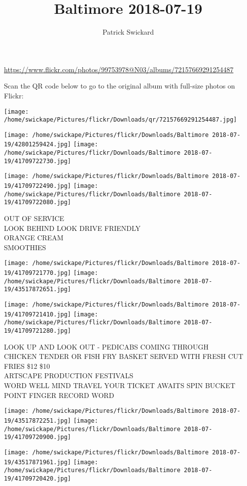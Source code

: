 \documentclass[10pt,letterpaper]{article}
\title{Baltimore 2018-07-19}
\author{Patrick Swickard}
\date{}
\begin{document}
\maketitle

\url{https://www.flickr.com/photos/99753978@N03/albums/72157669291254487}

Scan the QR code below to go to the original album with full-size photos on Flickr:

\texttt{[image: /home/swickape/Pictures/flickr/Downloads/qr/72157669291254487.jpg]}
\pagebreak

\texttt{[image: /home/swickape/Pictures/flickr/Downloads/Baltimore 2018-07-19/42801259424.jpg]}
\texttt{[image: /home/swickape/Pictures/flickr/Downloads/Baltimore 2018-07-19/41709722730.jpg]}

\texttt{[image: /home/swickape/Pictures/flickr/Downloads/Baltimore 2018-07-19/41709722490.jpg]}
\texttt{[image: /home/swickape/Pictures/flickr/Downloads/Baltimore 2018-07-19/41709722080.jpg]}

OUT OF SERVICE\\
LOOK BEHIND LOOK DRIVE FRIENDLY\\
ORANGE CREAM\\
SMOOTHIES
\pagebreak

\texttt{[image: /home/swickape/Pictures/flickr/Downloads/Baltimore 2018-07-19/41709721770.jpg]}
\texttt{[image: /home/swickape/Pictures/flickr/Downloads/Baltimore 2018-07-19/43517872651.jpg]}

\texttt{[image: /home/swickape/Pictures/flickr/Downloads/Baltimore 2018-07-19/41709721410.jpg]}
\texttt{[image: /home/swickape/Pictures/flickr/Downloads/Baltimore 2018-07-19/41709721280.jpg]}

LOOK UP AND LOOK OUT {-} PEDICABS COMING THROUGH\\
CHICKEN TENDER OR FISH FRY BASKET SERVED WITH FRESH CUT FRIES \$12 \$10\\
ARTSCAPE PRODUCTION FESTIVALS\\
WORD WELL MIND TRAVEL YOUR TICKET AWAITS SPIN BUCKET POINT FINGER RECORD WORD
\pagebreak

\texttt{[image: /home/swickape/Pictures/flickr/Downloads/Baltimore 2018-07-19/43517872251.jpg]}
\texttt{[image: /home/swickape/Pictures/flickr/Downloads/Baltimore 2018-07-19/41709720900.jpg]}

\texttt{[image: /home/swickape/Pictures/flickr/Downloads/Baltimore 2018-07-19/43517871961.jpg]}
\texttt{[image: /home/swickape/Pictures/flickr/Downloads/Baltimore 2018-07-19/41709720420.jpg]}
\end{document}

